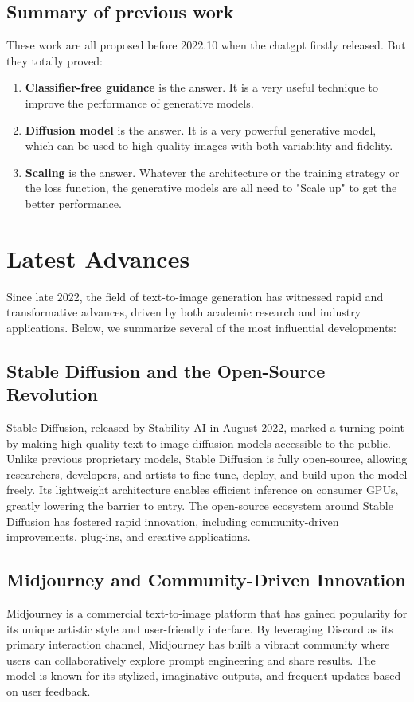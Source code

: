 \documentclass{article}
\begin{document}
\subsection{Summary of previous work}
These work are all proposed before 2022.10 when the chatgpt firstly released. But they totally proved:
\begin{enumerate}
    \item \textbf{Classifier-free guidance} is the answer. It is a very useful technique to improve the performance of generative models.
    \item \textbf{Diffusion model} is the answer. It is a very powerful generative model, which can be used to high-quality images 
    with both variability and fidelity.
    \item \textbf{Scaling} is the answer. Whatever the architecture or the training strategy or the loss function, the generative models are all 
    need to "Scale up" to get the better performance.
\end{enumerate}


\section{Latest Advances}

Since late 2022, the field of text-to-image generation has witnessed rapid and transformative advances, driven by both academic research and industry applications. Below, we summarize several of the most influential developments:

\subsection{Stable Diffusion and the Open-Source Revolution}
Stable Diffusion, released by Stability AI in August 2022, marked a turning point by making high-quality text-to-image diffusion models accessible to the public. Unlike previous proprietary models, Stable Diffusion is fully open-source, allowing researchers, developers, and artists to fine-tune, deploy, and build upon the model freely. Its lightweight architecture enables efficient inference on consumer GPUs, greatly lowering the barrier to entry. The open-source ecosystem around Stable Diffusion has fostered rapid innovation, including community-driven improvements, plug-ins, and creative applications.

\subsection{Midjourney and Community-Driven Innovation}
Midjourney is a commercial text-to-image platform that has gained popularity for its unique artistic style and user-friendly interface. By leveraging Discord as its primary interaction channel, Midjourney has built a vibrant community where users can collaboratively explore prompt engineering and share results. The model is known for its stylized, imaginative outputs, and frequent updates based on user feedback.
\end{document}
